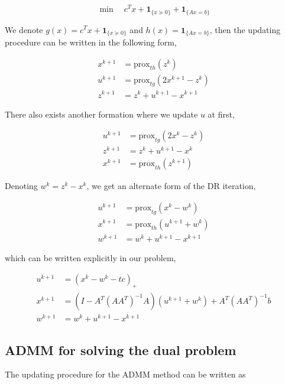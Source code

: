 \documentclass[a4paper]{article}
\begin{document}
\begin{equation}
\min \quad c^Tx + \mathbf{1}_{\{x\succeq0\}}+\mathbf{1}_{\{Ax=b\}}
\end{equation}

We denote $g(x) = c^Tx + \mathbf{1}_{\{x\succeq0\}}$ and $h(x)=\mathbf{1}_{\{Ax=b\}}$, then the updating procedure can be written in the following form,

\begin{equation}\label{DRS3}
\begin{split}
x^{k+1} &= \mathrm{prox}_{th}(z^k) \\
u^{k+1} &= \mathrm{prox}_{tg}(2x^{k+1}-z^k) \\
z^{k+1} &= z^{k}+u^{k+1}-x^{k+1}
\end{split}
\end{equation}

There also exists another formation where we update $u$ at first, 

\begin{equation}
\begin{split}
u^{k+1} &= \mathrm{prox}_{tg}(2x^{k}-z^k) \\
z^{k+1} &= z^{k}+u^{k+1}-x^{k}\\
x^{k+1} &= \mathrm{prox}_{th}(z^{k+1})
\end{split}
\end{equation}

Denoting $w^k = z^k-x^k$, we get an alternate form of the DR iteration, 

\begin{equation}
\begin{split}
u^{k+1}&=\mathrm{prox}_{tg}(x^k-w^k) \\
x^{k+1}&=\mathrm{prox}_{th}(u^{k+1} + w^k) \\
w^{k+1}&=w^k+u^{k+1}-x^{k+1}
\end{split}
\label{DRS2}
\end{equation}

which can be written explicitly in our problem, 

\begin{equation}
\begin{split}
u^{k+1}&=(x^k-w^k-tc)_+ \\
x^{k+1}&=(I-A^T(AA^T)^{-1}A)(u^{k+1}+w^k)+ A^T(AA^T)^{-1}b\\
w^{k+1}&=w^k+u^{k+1}-x^{k+1}
\end{split}
\end{equation}

\subsection{ADMM for solving the dual problem}
The updating procedure for the ADMM method can be written as
\end{document}
